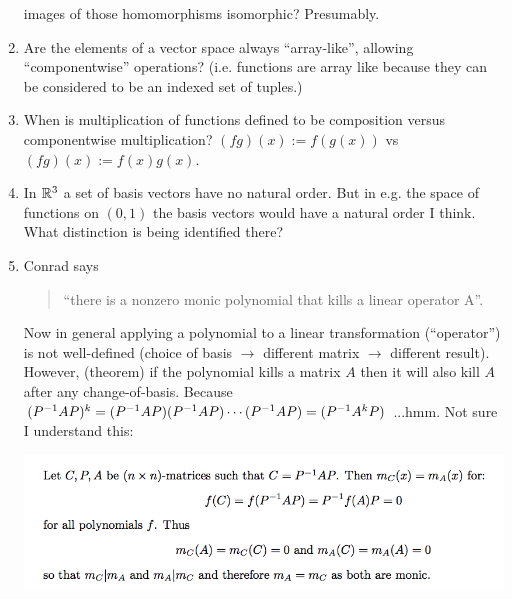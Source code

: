 \documentclass[12pt]{article}
\begin{document}
\begin{enumerate}
  images of those homomorphisms isomorphic? Presumably. 
\item Are the elements of a vector space always ``array-like'', allowing ``componentwise''
  operations? (i.e. functions are array like because they can be considered to be an indexed set of
  tuples.) 
\item When is multiplication of functions defined to be composition versus componentwise
  multiplication? $(fg)(x) := f(g(x))$ vs $(fg)(x) := f(x)g(x)$. 
\item In $\mathbb{R}^3$ a set of basis vectors have no natural order. But in e.g. the space of functions on
  $(0, 1)$ the basis vectors would have a natural order I think. What distinction is being
  identified there? 
\item Conrad says
  \begin{quote}
    ``there is a nonzero monic polynomial that kills a linear operator A''.
  \end{quote}
  Now in general applying a polynomial to a linear transformation (``operator'') is not
  well-defined (choice of basis $\rightarrow$ different matrix $\rightarrow$ different
  result). However, (theorem) if the polynomial kills a matrix $A$ then it will also kill $A$ after
  any change-of-basis. Because $(P^{-1}AP)^k = (P^{-1}AP)(P^{-1}AP)\cdots (P^{-1}AP) = (P^{-1}A^kP)$
  ...hmm. Not sure I understand this:
  \begin{mdframed}
    \includegraphics[width=400pt]{img/question-linear-algebra-a0-minimal-polynomial.png}
  \end{mdframed}
\end{enumerate}
\end{document}
